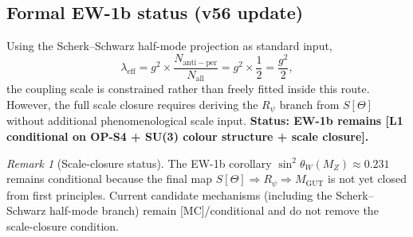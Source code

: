 \documentclass[12pt,a4paper]{article}
\theoremstyle{remark}
\newtheorem{remark}{Remark}[section]
\begin{document}
\subsection*{Formal EW-1b status (v56 update)}
Using the Scherk--Schwarz half-mode projection as standard input,
\[
\lambda_{\mathrm{eff}}=g^2\times\frac{N_{\mathrm{anti-per}}}{N_{\mathrm{all}}}
=g^2\times\frac12=\frac{g^2}{2},
\]
the coupling scale is constrained rather than freely fitted inside this route.
However, the full scale closure requires deriving the $R_\psi$ branch from
$S[\Theta]$ without additional phenomenological scale input.
\textbf{Status: EW-1b remains [L1 conditional on OP-S4 + SU(3) colour structure + scale closure].}

\begin{remark}[Scale-closure status]
\label{rem:rpsi_scale_closure}
The EW-1b corollary $\sin^2\theta_W(M_Z)\approx0.231$ remains conditional
because the final map $S[\Theta]\Rightarrow R_\psi \Rightarrow M_{\mathrm{GUT}}$
is not yet closed from first principles.
Current candidate mechanisms (including the Scherk--Schwarz half-mode branch)
remain [MC]/conditional and do not remove the scale-closure condition.
\end{remark}
\end{document}
